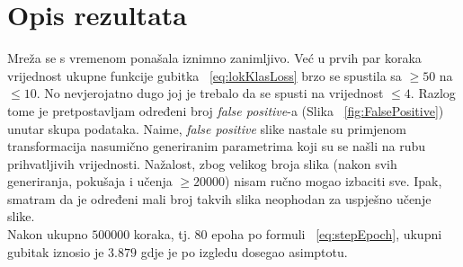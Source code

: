 \section{Opis rezultata}
Mreža se s vremenom ponašala iznimno zanimljivo.
Već u prvih par koraka vrijednost ukupne funkcije gubitka ~\ref{eq:lokKlasLoss} brzo se spustila sa $\geq 50$ na $\leq 10$.
No nevjerojatno dugo joj je trebalo da se spusti na vrijednost $\leq 4$.
Razlog tome je pretpostavljam određeni broj \emph{false positive}-a (Slika ~\ref{fig:FalsePositive}) unutar skupa podataka.
Naime, \emph{false positive} slike nastale su primjenom transformacija nasumično generiranim parametrima koji su se našli na rubu prihvatljivih vrijednosti.
Nažalost, zbog velikog broja slika (nakon svih generiranja, pokušaja i učenja $\geq 20000$) nisam ručno mogao izbaciti sve.
Ipak, smatram da je određeni mali broj takvih slika neophodan za uspješno učenje slike. \\
Nakon ukupno $500 000$ koraka, tj. $80$ epoha po formuli ~\ref{eq:stepEpoch},  ukupni gubitak iznosio je $3.879$ gdje je po izgledu dosegao asimptotu.
